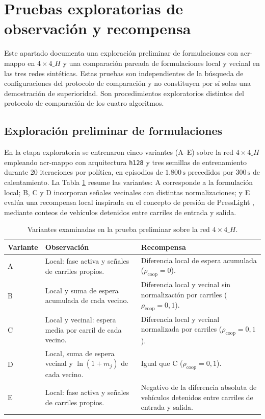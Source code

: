 \section{Pruebas exploratorias de observación y recompensa}
\label{sec:cooperacion_vecinal}
\label{sec:comparacion_local_vecinal}

Este apartado documenta una exploración preliminar de formulaciones con \acrshort{acr-mappo} en $4\times4\_H$ y una comparación pareada de formulaciones local y vecinal en las tres redes sintéticas. Estas pruebas son independientes de la búsqueda de configuraciones del protocolo de comparación y no constituyen por sí solas una demostración de superioridad. Son procedimientos exploratorios distintos del protocolo de comparación de los cuatro algoritmos.

\subsection{Exploración preliminar de formulaciones}
\label{subsec:screening_vecinal}

En la etapa exploratoria se entrenaron cinco variantes (A--E) sobre la red $4\times4\_H$ empleando \acrshort{acr-mappo} con arquitectura \texttt{h128} y tres semillas de entrenamiento durante 20 iteraciones por política, en episodios de $1.800\,\text{s}$ precedidos por $300\,\text{s}$ de calentamiento. La Tabla \ref{tab:variantes_vecinales} resume las variantes: A corresponde a la formulación local; B, C y D incorporan señales vecinales con distintas normalizaciones; y E evalúa una recompensa local inspirada en el concepto de presión de PressLight \cite{presslight2019}, mediante conteos de vehículos detenidos entre carriles de entrada y salida.

\begin{table}[!htbp]\centering\small
\caption{Variantes examinadas en la prueba preliminar sobre la red $4\times4\_H$.}\label{tab:variantes_vecinales}
\begin{tabular}{>{\raggedright\arraybackslash}p{2cm}>{\raggedright\arraybackslash}p{5.5cm}>{\raggedright\arraybackslash}p{5.7cm}}\hline
\textbf{Variante} & \textbf{Observación} & \textbf{Recompensa} \\\hline
A & Local: fase activa y señales de carriles propios. & Diferencia local de espera acumulada ($\rho_{\mathrm{coop}}=0$). \\
B & Local y suma de espera acumulada de cada vecino. & Diferencia local y vecinal sin normalización por carriles ($\rho_{\mathrm{coop}}=0{,}1$). \\
C & Local y vecinal: espera media por carril de cada vecino. & Diferencia local y vecinal normalizada por carriles ($\rho_{\mathrm{coop}}=0{,}1$). \\
D & Local, suma de espera vecinal y $\ln(1+m_j)$ de cada vecino. & Igual que C ($\rho_{\mathrm{coop}}=0{,}1$). \\
E & Local: fase activa y señales de carriles propios. & Negativo de la diferencia absoluta de vehículos detenidos entre carriles de entrada y salida. \\\hline
\end{tabular}\end{table}

